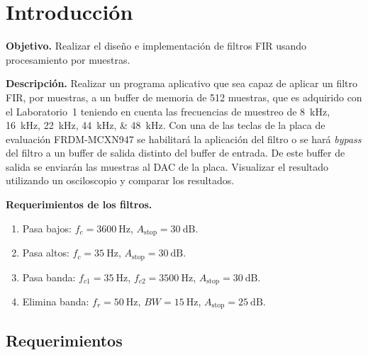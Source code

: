 \documentclass[11pt,a4paper]{article}
\begin{document}
\caratula
\setcounter{tocdepth}{2}
\tableofcontents
\clearpage

\section{Introducción}

\begin{consigna}
\textbf{Objetivo.} Realizar el diseño e implementación de filtros FIR usando
procesamiento por muestras.

\textbf{Descripción.} Realizar un programa aplicativo que sea capaz de aplicar
un filtro FIR, por muestras, a un buffer de memoria de 512 muestras, que es
adquirido con el Laboratorio~1 teniendo en cuenta las frecuencias de muestreo
de \qtylist{8;16;22;44;48}{\kilo\hertz}. Con una de las teclas de la placa de
evaluación FRDM-MCXN947 se habilitará la aplicación del filtro o se hará
\emph{bypass} del filtro a un buffer de salida distinto del buffer de entrada.
De este buffer de salida se enviarán las muestras al DAC de la placa.
Visualizar el resultado utilizando un osciloscopio y comparar los resultados.

\textbf{Requerimientos de los filtros.}
\begin{enumerate}[nosep,label=\textbf{F\arabic*},leftmargin=2.2em]
  \item \label{filtro:pb} Pasa bajos: $f_c = \qty{3600}{\hertz}$,
        $A_{\text{stop}} = \qty{30}{\deci\bel}$.
  \item \label{filtro:pa} Pasa altos: $f_c = \qty{35}{\hertz}$,
        $A_{\text{stop}} = \qty{30}{\deci\bel}$.
  \item \label{filtro:pbanda} Pasa banda: $f_{c1} = \qty{35}{\hertz}$,
        $f_{c2} = \qty{3500}{\hertz}$, $A_{\text{stop}} = \qty{30}{\deci\bel}$.
  \item \label{filtro:eb} Elimina banda: $f_r = \qty{50}{\hertz}$,
        $BW = \qty{15}{\hertz}$, $A_{\text{stop}} = \qty{25}{\deci\bel}$.
\end{enumerate}
\end{consigna}

\subsection{Requerimientos}
\end{document}
